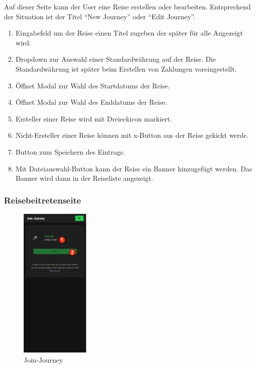 Auf dieser Seite kann der User eine Reise erstellen oder bearbeiten. Entsprechend der Situation ist der Titel  "`New Journey"' oder "`Edit Journey"'.

\begin{enumerate}[label=\protect\circled{\arabic*}]
	\item Eingabefeld um der Reise einen Titel zugeben der später für alle Angezeigt wird.
	\item Dropdown zur Auswahl einer Standardwährung auf der Reise.
	      Die Standardwährung ist später beim Erstellen von Zahlungen voreingestellt.
	\item Öffnet Modal zur Wahl des Startdatums der Reise.
	\item Öffnet Modal zur Wahl des Enddatums der Reise.
	\item Ersteller einer Reise wird mit Dreieckicon markiert.
	\item Nicht-Ersteller einer Reise können mit x-Button aus der Reise gekickt werde.
	\item Button zum Speichern des Eintrags.
	\item Mit Dateiauswahl-Button kann der Reise ein Banner hinzugefügt werden. Das Banner wird dann in der Reiseliste angezeigt.
\end{enumerate}

\subsubsection{Reisebeitretenseite}
\begin{figure}[H]
	\centering
	\includegraphics[width=0.3\textwidth]{img/pages_numbers/join-journey.drawio}
	\caption[Join-Journey]{Join-Journey}
	\label{fig:Join-Journey}
\end{figure}

